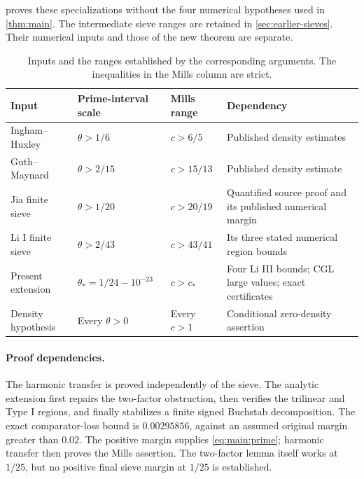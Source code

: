  proves these specializations without the four
numerical hypotheses used in \cref{thm:main}.
The intermediate sieve ranges are retained in \cref{sec:earlier-sieves}.
Their numerical inputs and those of the new theorem are separate.

\begin{table}[ht]
\centering\small
\caption{Inputs and the ranges established by the corresponding arguments.
The inequalities in the Mills column are strict.}
\label{tab:ranges}
\begin{tabularx}{\linewidth}{@{}>{\raggedright\arraybackslash}p{.23\linewidth}>{\raggedright\arraybackslash}p{.18\linewidth}>{\raggedright\arraybackslash}p{.17\linewidth}>{\raggedright\arraybackslash}X@{}}
\toprule
Input & Prime-interval scale & Mills range & Dependency\\
\midrule
Ingham--Huxley & $\theta>1/6$ & $c>6/5$ & Published density estimates\\
Guth--Maynard & $\theta>2/15$ & $c>15/13$ & Published density estimate\\
Jia finite sieve & $\theta>1/20$ & $c>20/19$ & Quantified source proof and its published numerical margin\\
Li I finite sieve & $\theta>2/43$ & $c>43/41$ & Its three stated numerical region bounds\\
Present extension & $\theta_*=1/24-10^{-23}$ & $c>c_*$ & Four Li III bounds; CGL large values; exact certificates\\
Density hypothesis & Every $\theta>0$ & Every $c>1$ & Conditional zero-density assertion\\
\bottomrule
\end{tabularx}
\end{table}

\paragraph{Proof dependencies.}
The harmonic transfer is proved independently of the sieve.
The analytic extension first repairs the two-factor obstruction, then
verifies the trilinear and Type I regions, and finally stabilizes a
finite signed Buchstab decomposition. The exact comparator-loss bound
is $0.00295856$, against an assumed original margin greater than $0.02$.
The positive margin supplies \eqref{eq:main:prime}; harmonic transfer
then proves the Mills assertion. The two-factor lemma itself works at
$1/25$, but no positive final sieve margin at $1/25$ is established.

